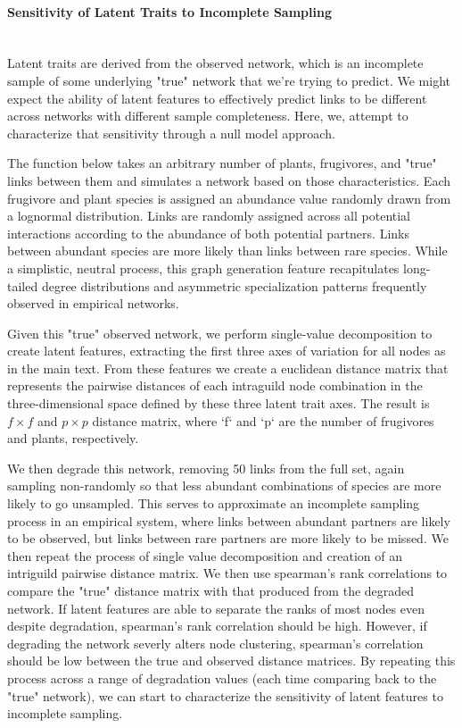 \paragraph*{Sensitivity of Latent Traits to Incomplete Sampling}\mbox{}\\

Latent traits are derived from the observed network, which is an incomplete sample of some underlying "true" network that we're trying to predict. We might expect the ability of latent features to effectively predict links to be different across networks with different sample completeness. Here, we, attempt to characterize that sensitivity through a null model approach. 

The function below takes an arbitrary number of plants, frugivores, and "true" links between them and simulates a network based on those characteristics. Each frugivore and plant species is assigned an abundance value randomly drawn from a lognormal distribution. Links are randomly assigned across all potential interactions according to the abundance of both potential partners. Links between abundant species are more likely than links between rare species. While a simplistic, neutral process, this graph generation feature recapitulates long-tailed degree distributions and asymmetric specialization patterns frequently observed in empirical networks. 

Given this "true" observed network, we perform single-value decomposition to create latent features, extracting the first three axes of variation for all nodes as in the main text. From these features we create a euclidean distance matrix that represents the pairwise distances of each intraguild node combination in the three-dimensional space defined by these three latent trait axes. The result is $f \times f$ and $p \times p$  distance matrix, where `f` and `p` are the number of frugivores and plants, respectively. 

We then degrade this network, removing 50 links from the full set, again sampling non-randomly so that less abundant combinations of species are more likely to go unsampled. This serves to approximate an incomplete sampling process in an empirical system, where links between abundant partners are likely to be observed, but links between rare partners are more likely to be missed. We then repeat the process of single value decomposition and creation of an intriguild pairwise distance matrix. We then use spearman's rank correlations to compare the "true" distance matrix with that produced from the degraded network. If latent features are able to separate the ranks of most nodes even despite degradation, spearman's rank correlation should be high. However, if degrading the network severly alters node clustering, spearman's correlation should be low between the true and observed distance matrices. By repeating this process across a range of degradation values (each time comparing back to the "true" network), we can start to characterize the sensitivity of latent features to incomplete sampling. 

